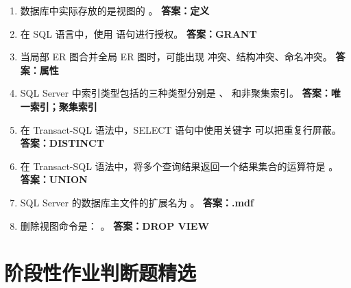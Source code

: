 \documentclass[12pt, a4paper]{article}
\begin{document}
\begin{enumerate}[label=\arabic*.]
    \item 数据库中实际存放的是视图的 \underline{\hspace{2cm}} 。
    \textbf{答案：定义}

    \item 在 SQL 语言中，使用 \underline{\hspace{2cm}} 语句进行授权。
    \textbf{答案：GRANT}

    \item 当局部 ER 图合并全局 ER 图时，可能出现 \underline{\hspace{2cm}} 冲突、结构冲突、命名冲突。
    \textbf{答案：属性}

    \item SQL Server 中索引类型包括的三种类型分别是 \underline{\hspace{2cm}} 、 \underline{\hspace{2cm}} 和非聚集索引。
    \textbf{答案：唯一索引；聚集索引}

    \item 在 Transact-SQL 语法中，SELECT 语句中使用关键字 \underline{\hspace{2cm}} 可以把重复行屏蔽。
    \textbf{答案：DISTINCT}

    \item 在 Transact-SQL 语法中，将多个查询结果返回一个结果集合的运算符是 \underline{\hspace{2cm}} 。
    \textbf{答案：UNION}

    \item SQL Server 的数据库主文件的扩展名为 \underline{\hspace{2cm}} 。
    \textbf{答案：.mdf}

    \item 删除视图命令是： \underline{\hspace{2cm}} 。
    \textbf{答案：DROP VIEW}
\end{enumerate}

\section{阶段性作业判断题精选}
\end{document}
